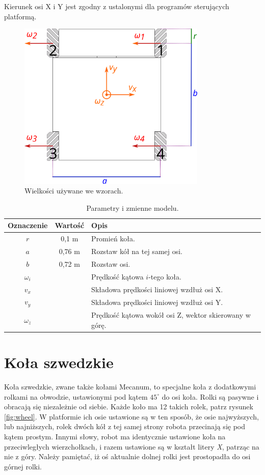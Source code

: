 	Kierunek osi X i Y jest zgodny z ustalonymi dla programów sterujących platformą.
	
	\begin{figure}[H]
		\centering
		\includegraphics[width=0.8\textwidth]{graphics/base_dims.pdf}
		\caption{Wielkości używane we wzorach.}
		\label{fig:base_dims}
	\end{figure} 

	\begin{table}
		\centering
		\begin{tabular}{c c l}
		Oznaczenie & Wartość & Opis \\
		\hline
		$r$ & 0,1 m & Promień koła. \\
		$a$ & 0,76 m & Rozstaw kół na tej samej osi. \\
		$b$ & 0,72 m & Rozstaw osi. \\
		$\omega_i$ & & Prędkość kątowa $i$-tego koła. \\
		$v_x$ & & Składowa prędkości liniowej wzdłuż osi X. \\
		$v_y$ & & Składowa prędkości liniowej wzdłuż osi Y. \\
		$\omega_z$ & & Prędkość kątowa wokół osi Z, wektor skierowany w górę. \\
		\end{tabular}
		\caption{Parametry i zmienne modelu.}
		\label{tab:dims}
	\end{table}

\section{Koła szwedzkie}
	Koła szwedzkie, zwane także kołami Mecanum, to specjalne koła z dodatkowymi rolkami na obwodzie, ustawionymi pod kątem $45^\circ$ do osi koła.
	Rolki są pasywne i obracają się niezależnie od siebie. Każde koło ma 12 takich rolek, patrz rysunek \ref{fig:wheel}.
	W platformie ich osie ustawione są w ten sposób, że osie najwyższych, lub najniższych, rolek dwóch kół z tej samej strony robota przecinają się pod kątem prostym.
	Innymi słowy, robot ma identycznie ustawione koła na przeciwległych wierzchołkach, i razem ustawione są w kształt litery \emph{X}, patrząc na nie z góry.
	Należy pamiętać, iż oś aktualnie dolnej rolki jest prostopadła do osi górnej rolki.

